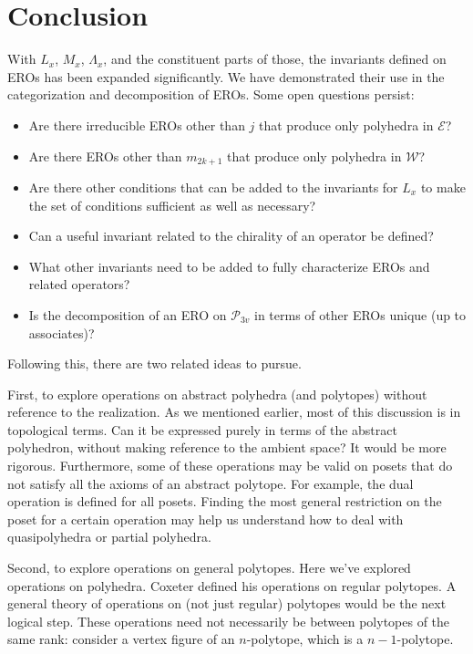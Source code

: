 \documentclass[12pt]{amsart}%
\begin{document}
\section{Conclusion}
With $L_x$, $M_x$, $\Lambda_x$, and the constituent parts of those,
the invariants defined on EROs has been expanded significantly. We have
demonstrated their use in the categorization and decomposition of EROs.
Some open questions persist:
\begin{itemize}
\item Are there irreducible EROs other than $j$ that produce only polyhedra in $\mathcal{E}$?
\item Are there EROs other than $m_{2k+1}$ that produce only polyhedra in  $\mathcal{W}$?
\item Are there other conditions that can be added to the invariants for $L_x$ to make the set of conditions sufficient as well as necessary?
\item Can a useful invariant related to the chirality of an operator be defined?
\item What other invariants need to be added to fully characterize EROs and related operators?
\item Is the decomposition of an ERO on $\mathcal{P}_{3v}$ in terms of
  other EROs unique (up to associates)?
\end{itemize}

Following this, there are two related ideas to pursue.

First, to explore operations on abstract polyhedra (and polytopes) without
reference to the realization. As we mentioned earlier, most of this discussion
is in topological terms. Can it be expressed purely in terms of the abstract
polyhedron, without making reference to the ambient space? It would be more
rigorous. Furthermore, some of these operations may be valid on posets that do
not satisfy all the axioms of an abstract polytope. For example, the dual
operation is defined for all posets. Finding the most general restriction on
the poset for a certain operation may help us understand how to deal with
quasipolyhedra or partial polyhedra.

Second, to explore operations on general polytopes. Here we've explored
operations on polyhedra. Coxeter defined his operations on regular polytopes.
A general theory of operations on (not just regular) polytopes would be the
next logical step. These operations need not necessarily be between polytopes
of the same rank: consider a vertex figure of an $n$-polytope, which is a
$n-1$-polytope.
\end{document}
